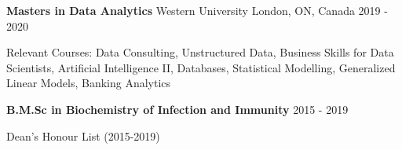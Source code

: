 

\begin{cventries}

    \cventry
        {\textbf{Masters in Data Analytics}}
        {Western University}
        {London, ON, Canada}
        {2019 - 2020}
        {
            \begin{cvitems}
                \item {Relevant Courses: Data Consulting, Unstructured Data, Business Skills for Data Scientists, Artificial
                Intelligence II, Databases, Statistical Modelling, Generalized Linear Models, Banking Analytics}
            \end{cvitems}
        }
        

    \cventry
        {\textbf{B.M.Sc in Biochemistry of Infection and Immunity}} %
        {} %
        {} %
        {2015 - 2019} %
        {
            \begin{cvitems} %
                \item {Dean’s Honour List (2015-2019)}
            \end{cvitems}
        }

\end{cventries}
